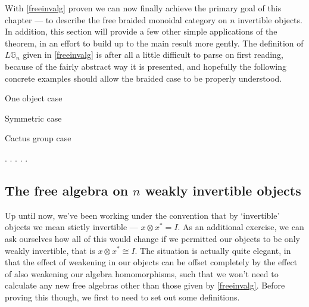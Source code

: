 With \cref{freeinvalg} proven we can now finally achieve the primary goal of this chapter --- to describe the free braided monoidal category on $n$ invertible objects. In addition, this section will provide a few other simple applications of the theorem, in an effort to build up to the main result more gently. The definition of $L\mathbb{G}_n$ given in \ref{freeinvalg} is after all a little difficult to parse on first reading, because of the fairly abstract way it is presented, and hopefully the following concrete examples should allow the braided case to be properly understood.

\begin{prop} One object case
\end{prop}

\begin{prop} Symmetric case
\end{prop}

\begin{prop} Cactus group case
\end{prop}

.
.
.
.
.


\subsection{The free algebra on $n$ weakly invertible objects}

Up until now, we've been working under the convention that by `invertible' objects we mean stictly invertible --- $x \otimes x^* = I$. As an additional exercise, we can ask ourselves how all of this would change if we permitted our objects to be only weakly invertible, that is $x \otimes x^* \cong I$. The situation is actually quite elegant, in that the effect of weakening in our objects can be offset completely by the effect of also weakening our algebra homomorphisms, such that we won't need to calculate any new free algebras other than those given by \cref{freeinvalg}. Before proving this though, we first to need to set out some definitions.

